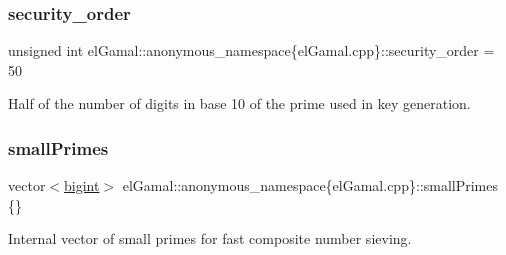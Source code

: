 \subsubsection{\texorpdfstring{security\+\_\+order}{security\_order}}
{\footnotesize\ttfamily unsigned int el\+Gamal\+::anonymous\+\_\+namespace\{el\+Gamal.\+cpp\}\+::security\+\_\+order = 50\hspace{0.3cm}{\ttfamily [static]}}



Half of the number of digits in base 10 of the prime used in key generation. 

\mbox{\label{namespaceelGamal_1_1anonymous__namespace_02elGamal_8cpp_03_a8de2fd78da2639622fdba15243c420a5}} 
\subsubsection{\texorpdfstring{small\+Primes}{smallPrimes}}
{\footnotesize\ttfamily vector$<$\mbox{\hyperlink{namespaceelGamal_ab2883bf41ce8d738e2428c8ae81b0245}{bigint}}$>$ el\+Gamal\+::anonymous\+\_\+namespace\{el\+Gamal.\+cpp\}\+::small\+Primes \{\}\hspace{0.3cm}{\ttfamily [static]}}



Internal vector of small primes for fast composite number sieving. 

